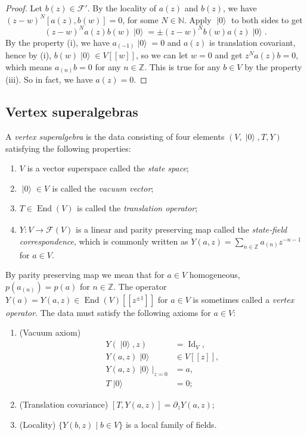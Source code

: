 \documentclass[a4paper, 12pt, reqno]{amsart}
\theoremstyle{remark}
\DeclareMathOperator{\Id}{Id}
\DeclareMathOperator{\End}{End}
\DeclareMathOperator{\vac}{|0\rangle}
\DeclareMathOperator{\zero}{\overline{0}}
\begin{document}
\begin{proof}
  Let $b(z) \in \mathcal{F}'$.
  By the locality of $a(z)$ and $b(z)$, we have $(z - w)^N[a(z), b(w)] = 0$, for some $N \in \mathbb{N}$.
  Apply $\vac$ to both sides to get
  \begin{equation*}
    (z - w)^Na(z)b(w)\vac = \pm(z - w)^Nb(w)a(z)\vac.
  \end{equation*}
  By the property (i), we have $a_{(-1)}\vac = 0$ and $a(z)$ is translation covariant, hence by (i), $b(w)\vac \in V[[w]]$, so we can let $w = 0$ and get $z^Na(z)b = 0$, which means $a_{(n)}b = 0$ for any $n \in \mathbb{Z}$.
  This is true for any $b \in V$ by the property (iii).
  So in fact, we have $a(z) = 0$.
\end{proof}

\subsection{Vertex superalgebras}
\label{sec:vertex-superalgebras}

A \emph{vertex superalgebra} is the data consisting of four elements $(V, \vac, T, Y)$ satisfying the following properties:
\begin{enumerate}
\item $V$ is a vector superspace called the \emph{state space};
\item $\vac \in V_{\zero}$ is called the \emph{vacuum vector};
\item $T \in \End(V)_{\zero}$ is called the \emph{translation operator};
\item $Y: V \to \mathcal{F}(V)$ is a linear and parity preserving map called the \emph{state-field correspondence}, which is commonly written as $Y(a, z) = \sum_{n \in \mathbb{Z}}a_{(n)}z^{-n - 1}$ for $a \in V$.
\end{enumerate}
By parity preserving map we mean that for $a \in V$ homogeneous, $p(a_{(n)}) = p(a)$ for $n \in \mathbb{Z}$.
The operator $Y(a) = Y(a, z) \in \End(V)[[z^{\pm1}]]$ for $a \in V$ is sometimes called a \emph{vertex operator}.
The data must satisfy the following axioms for $a \in V$:
\begin{enumerate}
\item (Vacuum axiom)
  \begin{align*}
    Y(\vac,z) &= \Id_V, \\
    Y(a, z)\vac &\in V[[z]], \\
    Y(a, z)\vac|_{z = 0} &= a, \\
    T\vac &= 0;
  \end{align*}
\item (Translation covariance) $[T, Y(a, z)] = \partial_zY(a, z)$;
\item (Locality) $\{Y(b, z) \mid b \in V\}$ is a local family of fields.
\end{enumerate}
\end{document}
